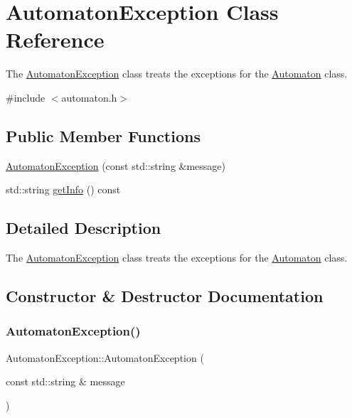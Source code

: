 \hypertarget{class_automaton_exception}{}\section{Automaton\+Exception Class Reference}
\label{class_automaton_exception}


The \mbox{\hyperlink{class_automaton_exception}{Automaton\+Exception}} class treats the exceptions for the \mbox{\hyperlink{class_automaton}{Automaton}} class.  




{\ttfamily \#include $<$automaton.\+h$>$}

\subsection*{Public Member Functions}
\begin{DoxyCompactItemize}
\item 
\mbox{\hyperlink{class_automaton_exception_a680f74417b9b004438bf0e95830c38fb}{Automaton\+Exception}} (const std\+::string \&message)
\item 
std\+::string \mbox{\hyperlink{class_automaton_exception_a8f72ab5625f64cde775caba3eef5b932}{get\+Info}} () const
\end{DoxyCompactItemize}


\subsection{Detailed Description}
The \mbox{\hyperlink{class_automaton_exception}{Automaton\+Exception}} class treats the exceptions for the \mbox{\hyperlink{class_automaton}{Automaton}} class. 

\subsection{Constructor \& Destructor Documentation}
\mbox{\label{class_automaton_exception_a680f74417b9b004438bf0e95830c38fb}} 
\subsubsection{\texorpdfstring{Automaton\+Exception()}{AutomatonException()}}
{\footnotesize\ttfamily Automaton\+Exception\+::\+Automaton\+Exception (\begin{DoxyParamCaption}\item[{const std\+::string \&}]{message }\end{DoxyParamCaption})\hspace{0.3cm}{\ttfamily [inline]}}

